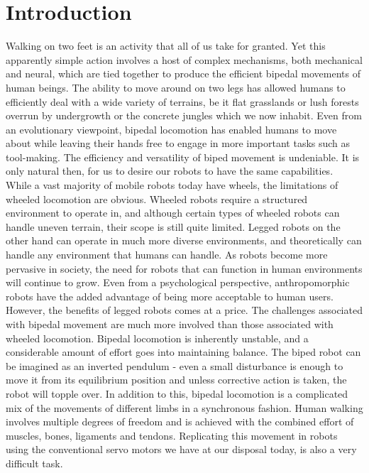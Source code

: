 \documentclass[12pt,twoside]{article}
\theoremstyle{plain}
\theoremstyle{definition}
\theoremstyle{remark}
\newcommand{\forceindent}{\leavevmode{\parindent=2em\indent}}
\begin{document}
\section{Introduction}
\label{sec:introduction}
\forceindent Walking on two feet is an activity that all of us take for granted. Yet this apparently simple action involves a host of complex mechanisms, both mechanical and neural, which are tied together to produce the efficient bipedal movements of human beings. The ability to move around on two legs has allowed humans to efficiently deal with a wide variety of terrains, be it flat grasslands or lush forests overrun by undergrowth or the concrete jungles which we now inhabit. Even from an evolutionary viewpoint, bipedal locomotion has enabled humans to move about while leaving their hands free to engage in more important tasks such as tool-making. The efficiency and versatility of biped movement is undeniable. It is only natural then, for us to desire our robots to have the same capabilities.\\ 
\forceindent While a vast majority of mobile robots today have wheels, the limitations of wheeled locomotion are obvious. Wheeled robots require a structured environment to operate in, and although certain types of wheeled robots can handle uneven terrain, their scope is still quite limited. Legged robots on the other hand can operate in much more diverse environments, and theoretically can handle any environment that humans can handle. As robots become more pervasive in society, the need for robots that can function in human environments will continue to grow. Even from a psychological perspective, anthropomorphic robots have the added advantage of being more acceptable to human users.\\
\forceindent However, the benefits of legged robots comes at a price. The challenges associated with bipedal movement are much more involved than those associated with wheeled locomotion. Bipedal locomotion is inherently unstable, and a considerable amount of effort goes into maintaining balance. The biped robot can be imagined as an inverted pendulum - even a small disturbance is enough to move it from its equilibrium position and unless corrective action is taken, the robot will topple over. In addition to this, bipedal locomotion is a complicated mix of the movements of different limbs in a synchronous fashion. Human walking involves multiple degrees of freedom and is achieved with the combined effort of muscles, bones, ligaments and tendons. Replicating this movement in robots using the conventional servo motors we have at our disposal today, is also a very difficult task.\\
\end{document}
